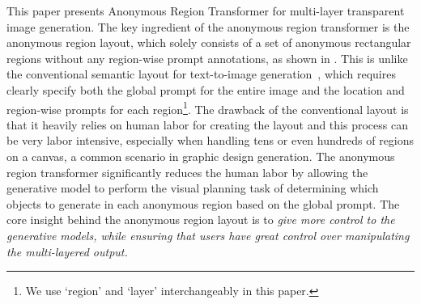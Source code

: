 This paper presents Anonymous Region Transformer for multi-layer transparent image generation. The key ingredient of the anonymous region transformer is the anonymous region layout, which solely consists of a set of anonymous rectangular regions without any region-wise prompt annotations, as shown in . This is unlike the conventional semantic layout for text-to-image generation~\cite{li2023gligen,yang2024mastering,yang2023reco}, which requires clearly specify both the global prompt for the entire image and the location and region-wise prompts for each region\footnote{We use `region' and `layer' interchangeably in this paper.}. The drawback of the conventional layout is that it heavily relies on human labor for creating the layout and this process can be very labor intensive, especially when handling tens or even hundreds of regions on a canvas, a common scenario in graphic design generation. The anonymous region transformer significantly reduces the human labor by allowing the generative model to perform the visual planning task of determining which objects to generate in each anonymous region based on the global prompt.
The core insight behind the anonymous region layout is to \emph{give more control to the generative models, while ensuring that users have great control over manipulating the multi-layered output.}

